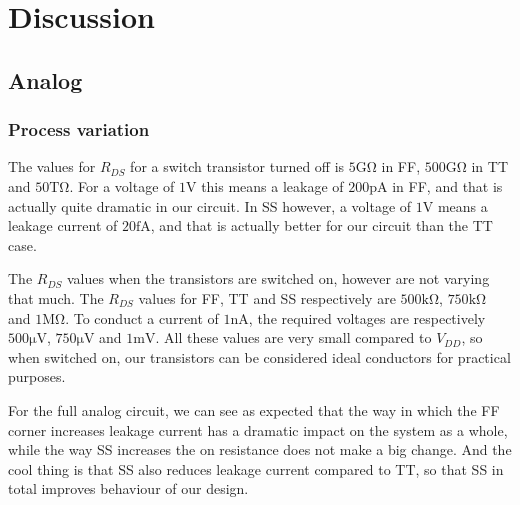 \section{Discussion}
\subsection{Analog}
\subsubsection{Process variation}

The values for $R_{DS}$ for a switch transistor turned off is $5 \mathrm{G\Omega}$ in FF, $500 \mathrm{G\Omega}$ in TT and $50 \mathrm{T\Omega}$. For a voltage of $1\mathrm{V}$ this means a leakage of $200\mathrm{pA}$ in FF, and that is actually quite dramatic in our circuit. In SS however, a voltage of $1\mathrm{V}$ means a leakage current of $20\mathrm{fA}$, and that is actually better for our circuit than the TT case.

The $R_{DS}$ values when the transistors are switched on, however are not varying that much. The $R_{DS}$ values for FF, TT and SS respectively are $500 \mathrm{k\Omega}$, $750 \mathrm{k\Omega}$ and $1 \mathrm{M\Omega}$. To conduct a current of $1\mathrm{nA}$, the required voltages are respectively $500 \mathrm{\mu V}$, $750 \mathrm{\mu V}$ and $1 \mathrm{mV}$. All these values are very small compared to $V_{DD}$, so when switched on, our transistors can be considered ideal conductors for practical purposes.

For the full analog circuit, we can see as expected that the way in which the FF corner increases leakage current has a dramatic impact on the system as a whole, while the way SS increases the on resistance does not make a big change. And the cool thing is that SS also reduces leakage current compared to TT, so that SS in total improves behaviour of our design.
